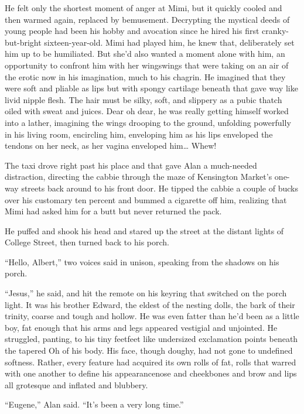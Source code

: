 He felt only the shortest moment of anger at Mimi, but it quickly
cooled and then warmed again, replaced by bemusement.  Decrypting the
mystical deeds of young people had been his hobby and avocation since
he hired his first cranky-but-bright sixteen-year-old.  Mimi had
played him, he knew that, deliberately set him up to be humiliated. 
But she'd also wanted a moment alone with him, an opportunity to
confront him with her wings\dash{}wings that were taking on an air of the
erotic now in his imagination, much to his chagrin.  He imagined that
they were soft and pliable as lips but with spongy cartilage beneath
that gave way like livid nipple flesh.  The hair must be silky, soft,
and slippery as a pubic thatch oiled with sweat and juices.  Dear oh
dear, he was really getting himself worked into a lather, imagining
the wings drooping to the ground, unfolding powerfully in his living
room, encircling him, enveloping him as his lips enveloped the tendons
on her neck, as her vagina enveloped him\ldots{}  Whew!

The taxi drove right past his place and that gave Alan a much-needed
distraction, directing the cabbie through the maze of Kensington
Market's one-way streets back around to his front door.  He tipped the
cabbie a couple of bucks over his customary ten percent and bummed a
cigarette off him, realizing that Mimi had asked him for a butt but
never returned the pack.

He puffed and shook his head and stared up the street at the distant
lights of College Street, then turned back to his porch.

``Hello, Albert,'' two voices said in unison, speaking from the
shadows on his porch.

``Jesus,'' he said, and hit the remote on his keyring that switched on
the porch light.  It was his brother Edward, the eldest of the nesting
dolls, the bark of their trinity, coarse and tough and hollow.  He was
even fatter than he'd been as a little boy, fat enough that his arms
and legs appeared vestigial and unjointed.  He struggled, panting, to
his tiny feet\dash{}feet like undersized exclamation points beneath the
tapered Oh of his body.  His face, though doughy, had not gone to
undefined softness.  Rather, every feature had acquired its own rolls
of fat, rolls that warred with one another to define his
appearance\dash{}nose and cheekbones and brow and lips all grotesque and
inflated and blubbery.

``Eugene,'' Alan said.  ``It's been a very long time.''

